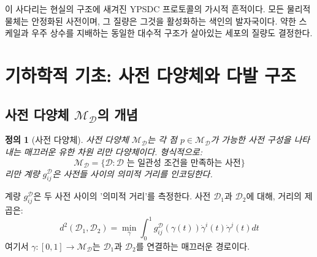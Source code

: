 \documentclass[11pt,a4paper]{article}
\newtheorem{definition}{정의}
\begin{document}
	이 사다리는 현실의 구조에 새겨진 YPSDC 프로토콜의 가시적 흔적이다. 모든 물리적 물체는 안정화된 사전이며, 그 질량은 그것을 활성화하는 색인의 발자국이다. 약한 스케일과 우주 상수를 지배하는 동일한 대수적 구조가 살아있는 세포의 질량도 결정한다.
	
	\section{기하학적 기초: 사전 다양체와 다발 구조}
	\subsection{사전 다양체 $\mathcal{M}_{\mathcal{D}}$의 개념}
	
	\begin{definition}[사전 다양체]
		사전 다양체 $\mathcal{M}_{\mathcal{D}}$는 각 점 $p \in \mathcal{M}_{\mathcal{D}}$가 가능한 사전 구성을 나타내는 매끄러운 유한 차원 리만 다양체이다. 형식적으로:
		\begin{equation}
			\mathcal{M}_{\mathcal{D}} = \{ \mathcal{D} : \mathcal{D} \text{ 는 일관성 조건을 만족하는 사전} \}
		\end{equation}
		리만 계량 $g_{ij}^{\mathcal{D}}$은 사전들 사이의 의미적 거리를 인코딩한다.
	\end{definition}
	
	계량 $g_{ij}^{\mathcal{D}}$은 두 사전 사이의 '의미적 거리'를 측정한다. 사전 $\mathcal{D}_1$과 $\mathcal{D}_2$에 대해, 거리의 제곱은:
	\begin{equation}
		d^2(\mathcal{D}_1, \mathcal{D}_2) = \min_{\gamma} \int_0^1 g_{ij}^{\mathcal{D}}(\gamma(t)) \dot{\gamma}^i(t) \dot{\gamma}^j(t) dt
	\end{equation}
	여기서 $\gamma: [0,1] \to \mathcal{M}_{\mathcal{D}}$는 $\mathcal{D}_1$과 $\mathcal{D}_2$를 연결하는 매끄러운 경로이다.
	
\end{document}
